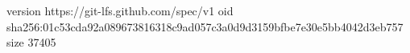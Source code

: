 version https://git-lfs.github.com/spec/v1
oid sha256:01c53cda92a089673816318c9ad057c3a0d9d3159bfbe7e30e5bb4042d3eb757
size 37405
